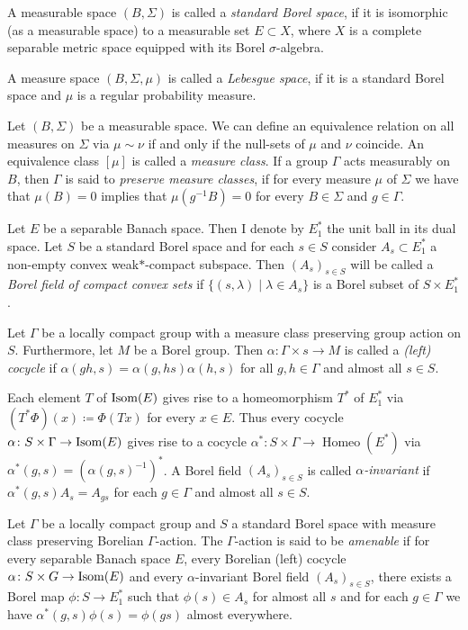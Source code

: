 \begin{defin}
  A measurable space \((B, \Sigma)\) is called a \emph{standard Borel space}, if it is isomorphic (as a measurable space) to a measurable set \(E \subset X\), where \(X\) is a complete separable metric space equipped with its Borel \(\sigma\)-algebra.

  A measure space \((B, \Sigma, \mu)\) is called a \emph{Lebesgue space}, if it is a standard Borel space and \(\mu\) is a regular probability measure.

  Let \((B, \Sigma)\) be a measurable space. We can define an equivalence relation on all measures on \(\Sigma\) via \(\mu \sim \nu\) if and only if the null-sets of \(\mu\) and \(\nu\) coincide. An equivalence class \([\mu]\) is called a \emph{measure class}. If a group \(\Gamma\) acts measurably on \(B\), then \(\Gamma\) is said to \emph{preserve measure classes}, if for every measure \(\mu\) of \(\Sigma\) we have that \(\mu(B) = 0\) implies that \(\mu(g^{-1} B) = 0\) for every \(B \in \Sigma\) and \(g \in \Gamma\).
\end{defin}

\begin{defin}
  Let \(E\) be a separable Banach space. Then I denote by \(E^\ast_1\) the unit ball in its dual space. Let \(S\) be a standard Borel space and for each \(s \in S\) consider \(A_s \subset E^\ast_1\) a non-empty convex weak\(\ast\)-compact subspace. Then \((A_s)_{s \in S}\) will be called a \emph{Borel field of compact convex sets} if \(\{(s, \lambda) \mid \lambda \in A_s\}\) is a Borel subset of \(S \times E^\ast_1\).

  Let \(\Gamma\) be a locally compact group with a measure class preserving group action on \(S\). Furthermore, let \(M\) be a Borel group. Then \(\alpha \colon \Gamma \times s \to M\) is called a \emph{(left) cocycle} if \(\alpha(gh, s) = \alpha(g, hs) \alpha(h, s)\) for all \(g, h \in \Gamma\) and almost all \(s \in S\).

  Each element \(T\) of \(\operatorname{Isom}(E)\) gives rise to a homeomorphism \(T^\ast\) of \(E^\ast_1\) via \((T^\ast\Phi)(x) \coloneqq \Phi(Tx)\) for every \(x \in E\). Thus every cocycle \(\alpha \colon S \times \Gamma \to \operatorname{Isom}(E)\) gives rise to a cocycle \(\alpha^\ast \colon S \times \Gamma \to \operatorname{Homeo}(E^\ast)\) via \(\alpha^\ast (g, s) = (\alpha(g, s)^{-1})^\ast\). A Borel field \((A_s)_{s \in S}\) is called \emph{\(\alpha\)-invariant} if \(\alpha^\ast(g, s) A_{s} = A_{gs}\) for each \(g \in \Gamma\) and almost all \(s \in S\).
  
  Let \(\Gamma\) be a locally compact group and \(S\) a standard Borel space with measure class preserving Borelian \(\Gamma\)-action. The \(\Gamma\)-action is said to be \emph{amenable} if for every separable Banach space \(E\), every Borelian (left) cocycle \(\alpha \colon S \times G \to \operatorname{Isom}(E)\) and every \(\alpha\)-invariant Borel field \((A_s)_{s \in S}\), there exists a Borel map \(\phi \colon S \to E^\ast_1\) such that \(\phi(s) \in A_s\) for almost all \(s\) and for each \(g \in \Gamma\) we have \(\alpha^\ast(g, s) \phi(s) = \phi(gs)\) almost everywhere.
\end{defin}

